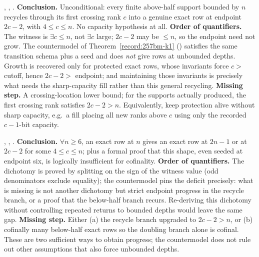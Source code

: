 \begin{obs}
,
,
.
\textbf{Conclusion.} Unconditional: every finite above-half support bounded by $n$ recycles through
its first crossing rank $c$ into a genuine exact row at endpoint $2c{-}2$, with $4 \le c \le n$.
No capacity hypothesis at all.
\textbf{Order of quantifiers.} The witness is $\exists c \le n$, not $\exists c$
large; $2c{-}2$ may be $\le n$, so the endpoint need not grow.
The countermodel of Theorem~\ref{record:257bm-k1}
()
satisfies the same transition schema plus a seed and does \emph{not} give rows at unbounded
depths.  Growth is recovered only for protected exact rows, whose invariants force
$c>$cutoff, hence $2c{-}2>$ endpoint; and maintaining those invariants is precisely what needs the sharp-capacity fill
rather than this general recycling.
\textbf{Missing step.} A crossing-location lower bound; for the supports actually produced, the
first crossing rank satisfies $2c{-}2>n$. Equivalently, keep protection alive without sharp
capacity, e.g.\ a fill placing all new ranks above $c$ using only the recorded $c{-}1$-bit
capacity.
\end{obs}

\begin{obs}
,
,
.
\textbf{Conclusion.} $\forall n \ge 6$, an exact row at $n$ gives an exact row at $2n{-}1$ or at
$2c{-}2$ for some $4 \le c \le n$; plus a formal proof that this shape, even seeded at endpoint
six, is logically insufficient for cofinality.
\textbf{Order of quantifiers.} The dichotomy is proved by splitting on the sign
of the witness value (odd denominators exclude equality); the countermodel pins the
deficit precisely: what is missing is not another dichotomy but strict endpoint progress in the
recycle branch, or a proof that the below-half branch recurs. Re-deriving this dichotomy without controlling repeated returns to
bounded depths would leave the same gap.
\textbf{Missing step.} Either (a) the recycle branch upgraded to $2c{-}2>n$, or (b) cofinally many
below-half exact rows so the doubling branch alone is cofinal. These are two sufficient ways to obtain progress; the countermodel
does not rule out other assumptions that also force unbounded depths.
\end{obs}

